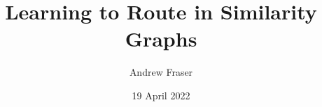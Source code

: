 \documentclass{beamer}
\title{Learning to Route in Similarity Graphs}
\author{Andrew Fraser}
\date{19 April 2022}
\begin{document}
	\begin{frame}
		\titlepage
	\end{frame}

	
	
	
\end{document}
